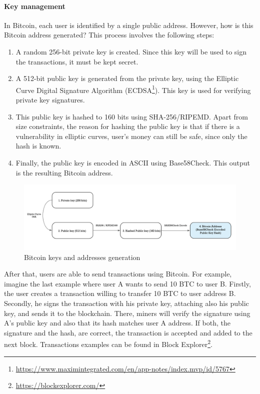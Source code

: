 \paragraph{Key management}

In Bitcoin, each user is identified by a single public address. However, how is this Bitcoin address generated? This process involves the following steps:

\begin{enumerate}
	
	\item A random 256-bit private key is created. Since this key will be used to sign the transactions, it must be kept secret.
	\item A 512-bit public key is generated from the private key, using the Elliptic Curve Digital Signature Algorithm (ECDSA\footnote{\url{https://www.maximintegrated.com/en/app-notes/index.mvp/id/5767}}). This key is used for verifying private key signatures.
	\item This public key is hashed to 160 bits using SHA-256/RIPEMD. Apart from size constraints, the reason for hashing the public key is that if there is a vulnerability in elliptic curves, user's money can still be safe, since only the hash is known.
	\item Finally, the public key is encoded in ASCII using Base58Check. This output is the resulting Bitcoin address.
	
\end{enumerate}

\begin{figure}[bth]
  \centering
  \includegraphics[width=0.9\linewidth]{gfx/bitkeys}    
  \caption{Bitcoin keys and addresses generation \citep{BitcoinKey2018}}
  \label{fig:EthereumAccounts}
\end{figure}

After that, users are able to send transactions using Bitcoin. For example, imagine the last example where user A wants to send 10 BTC to user B. Firstly, the user creates a transaction willing to transfer 10 BTC to user address B. Secondly, he signs the transaction with his private key, attaching also his public key, and sends it to the blockchain. There, miners will verify the signature using A's public key and also that its hash matches user A address. If both, the signature and the hash, are correct, the transaction is accepted and added to the next block. Transactions examples can be found in Block Explorer\footnote{\url{https://blockexplorer.com/}}.

